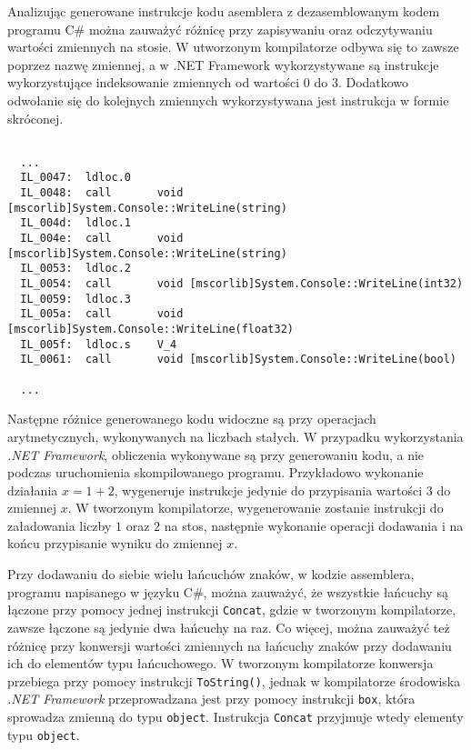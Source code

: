 \par Analizując generowane instrukcje kodu asemblera z dezasemblowanym kodem programu C\# można zauważyć różnicę przy zapisywaniu oraz odczytywaniu wartości zmiennych na stosie. W utworzonym kompilatorze odbywa się to zawsze poprzez nazwę zmiennej, a w .NET Framework wykorzystywane są instrukcje wykorzystujące indeksowanie zmiennych od wartości 0 do 3. Dodatkowo odwołanie się do kolejnych zmiennych wykorzystywana jest instrukcja w formie skróconej.


\begin{lstlisting}[language=IL, caption={Fragment kodu deasemblerowanego testu programu C\#, przedstawiający ładowanie wartości zmiennych na stos}, label=alg:asm]

  ...
  IL_0047:  ldloc.0
  IL_0048:  call       void [mscorlib]System.Console::WriteLine(string)
  IL_004d:  ldloc.1
  IL_004e:  call       void [mscorlib]System.Console::WriteLine(string)
  IL_0053:  ldloc.2
  IL_0054:  call       void [mscorlib]System.Console::WriteLine(int32)
  IL_0059:  ldloc.3
  IL_005a:  call       void [mscorlib]System.Console::WriteLine(float32)
  IL_005f:  ldloc.s    V_4
  IL_0061:  call       void [mscorlib]System.Console::WriteLine(bool)

  ...
\end{lstlisting}

\par Następne różnice generowanego kodu widoczne są przy operacjach arytmetycznych, wykonywanych na liczbach stałych. W przypadku wykorzystania \textit{.NET Framework}, obliczenia wykonywane są przy generowaniu kodu, a nie podczas uruchomienia skompilowanego programu. Przykładowo wykonanie działania $x = 1 + 2$, wygeneruje instrukcje jedynie do przypisania wartości $3$ do zmiennej $x$. W tworzonym kompilatorze, wygenerowanie zostanie instrukcji do załadowania liczby $1$ oraz $2$ na stos, następnie wykonanie operacji dodawania i na końcu przypisanie wyniku do zmiennej $x$.
\par Przy dodawaniu do siebie wielu łańcuchów znaków, w kodzie assemblera, programu napisanego w języku C\#, można zauważyć, że wszystkie łańcuchy są łączone przy pomocy jednej instrukcji \texttt{Concat}, gdzie w tworzonym kompilatorze, zawsze łączone są jedynie dwa łańcuchy na raz. Co więcej, można zauważyć też różnicę przy konwersji wartości zmiennych na łańcuchy znaków przy dodawaniu ich do elementów typu łańcuchowego. W tworzonym kompilatorze konwersja przebiega przy pomocy instrukcji \texttt{ToString()}, jednak w kompilatorze środowiska \textit{.NET Framework} przeprowadzana jest przy pomocy instrukcji \texttt{box}, która sprowadza zmienną do typu \texttt{object}. Instrukcja \texttt{Concat} przyjmuje wtedy elementy typu \texttt{object}.

